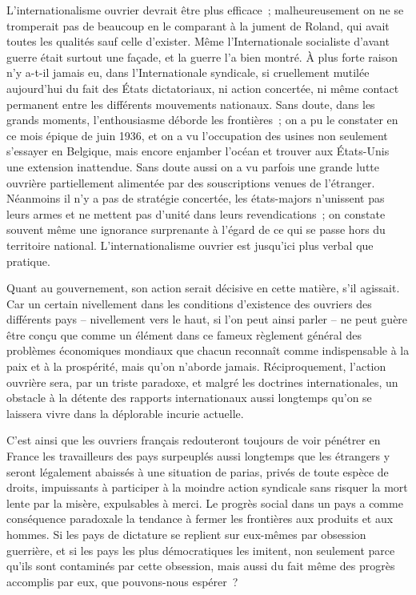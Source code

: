 \documentclass[french,twoside]{book} %
\begin{document}
L'internationalisme ouvrier devrait être plus efficace ; malheureusement on ne se tromperait pas de beaucoup en le comparant à la jument de Roland, qui avait toutes les qualités sauf celle d'exister. Même l'Internationale socialiste d'avant guerre était surtout une façade, et la guerre l'a bien montré. À plus forte raison n'y a-t-il jamais eu, dans l'Internationale syndicale, si cruellement mutilée aujourd'hui du fait des États dictatoriaux, ni action concertée, ni même contact permanent entre les différents mouvements nationaux. Sans doute, dans les grands moments, l'enthousiasme déborde les frontières ; on a pu le constater en ce mois épique de juin 1936, et on a vu l'occupation des usines non seulement s'essayer en Belgique, mais encore enjamber l'océan et trouver aux États-Unis une extension inattendue. Sans doute aussi on a vu parfois une grande lutte ouvrière partiellement alimentée par des souscriptions venues de l'étranger. Néanmoins il n'y a pas de stratégie concertée, les états-majors n'unissent pas leurs armes et ne mettent pas d'unité dans leurs revendications ; on constate souvent même une ignorance surprenante à l'égard de ce qui se passe hors du territoire national. L'internationalisme ouvrier est jusqu'ici plus verbal que pratique.\par
Quant au gouvernement, son action serait décisive en cette matière, s'il agissait. Car un certain nivellement dans les conditions d'existence des ouvriers des différents pays – nivellement vers le haut, si l'on peut ainsi parler – ne peut guère être conçu que comme un élément dans ce fameux règlement général des problèmes économiques mondiaux que chacun reconnaît comme indispensable à la paix et à la prospérité, mais qu'on n'aborde jamais. Réciproquement, l'action ouvrière sera, par un triste paradoxe, et malgré les doctrines internationales, un obstacle à la détente des rapports internationaux aussi longtemps qu'on se laissera vivre dans la déplorable incurie actuelle.\par
C'est ainsi que les ouvriers français redouteront toujours de voir pénétrer en France les travailleurs des pays surpeuplés aussi longtemps que les étrangers y seront légalement abaissés à une situation de parias, privés de toute espèce de droits, impuissants à participer à la moindre action syndicale sans risquer la mort lente par la misère, expulsables à merci. Le progrès social dans un pays a comme conséquence paradoxale la tendance à fermer les frontières aux produits et aux hommes. Si les pays de dictature se replient sur eux-mêmes par obsession guerrière, et si les pays les plus démocratiques les imitent, non seulement parce qu'ils sont contaminés par cette obsession, mais aussi du fait même des progrès accomplis par eux, que pouvons-nous espérer ?\par
\end{document}
